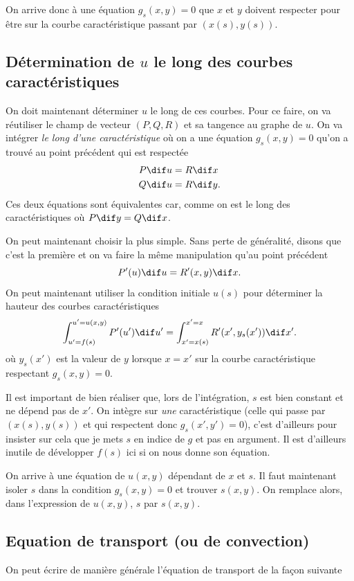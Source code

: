 On arrive donc à une équation $g_s(x, y) = 0$ que $x$ et $y$ doivent
respecter pour être sur la courbe caractéristique passant par $(x(s), y(s))$.

\subsection{Détermination de $u$ le long des courbes caractéristiques}
On doit maintenant déterminer $u$ le long de ces courbes.
Pour ce faire, on va réutiliser le champ de vecteur $(P, Q, R)$ et sa
tangence au graphe de $u$.
On va intégrer \emph{le long d'une caractéristique} où on a
une équation $g_s(x, y) = 0$ qu'on a trouvé au point précédent
qui est respectée
\begin{align*}
  P \dif u & = R \dif x\\
  Q \dif u & = R \dif y.
\end{align*}
Ces deux équations sont équivalentes car, comme on est le long des
caractéristiques où $P \dif y = Q \dif x$.

On peut maintenant choisir la plus simple.
Sans perte de généralité, disons que c'est la première et
on va faire la même manipulation qu'au point précédent
\[ P'(u) \dif u = R'(x, y) \dif x. \]
On peut maintenant utiliser la condition initiale $u(s)$ pour
déterminer la hauteur des courbes caractéristiques
\[ \int_{u' = f(s)}^{u' = u(x,y)} P'(u') \dif u'
= \int_{x' = x(s)}^{x' = x} R'(x', y_s(x')) \dif x'. \]
où $y_s(x')$ est la valeur de $y$ lorsque $x = x'$
sur la courbe caractéristique respectant $g_s(x, y) = 0$.

\begin{myrem}
  Il est important de bien réaliser que, lors de l'intégration,
  $s$ est bien constant et ne dépend pas de $x'$.
  On intègre sur \emph{une} caractéristique
  (celle qui passe par $(x(s), y(s))$ et qui respectent donc
  $g_s(x', y') = 0$), c'est d'ailleurs pour insister sur cela que je mets
  $s$ en indice de $g$ et pas en argument.
  Il est d'ailleurs inutile de développer $f(s)$ ici si on nous donne
  son équation.
\end{myrem}

On arrive à une équation de $u(x, y)$ dépendant de $x$ et $s$.
Il faut maintenant isoler $s$ dans la condition $g_s(x, y) = 0$ et trouver
$s(x, y)$.
On remplace alors, dans l'expression de $u(x, y)$, $s$ par $s(x, y)$.

\subsection{Equation de transport (ou de convection)}
On peut écrire de manière générale l'équation de transport de la façon
suivante

